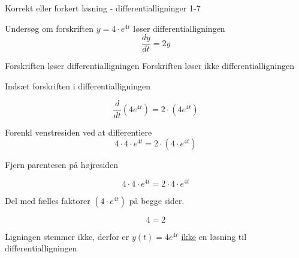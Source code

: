 \documentclass{article}
\begin{document}
\begin{exercise}{Korrekt eller forkert løsning - differentialligninger 1-7}
	
	
	Undersøg om forskriften $y = 4 \cdot e^{4t}$ løser differentialligningen
	\[
	\frac{dy}{dt} = 2y
	\]
	
\begin{multichoice}
	\itemfalse Forskriften løser differentialligningen 
	\itemtrue Forskriften løser ikke differentialligningen 
\end{multichoice}
	
	\hint
	
	Indsæt forskriften i differentialligningen
	
	\hint
	\[
	\frac{d}{dt} \left( 4 e^{4t}\right) = 2 \cdot \left( 4 e^{4t} \right)
	\]
	
	
	\hint
	
	Forenkl venstresiden ved at differentiere
	\[
	4 \cdot 4 \cdot e^{4t} = 2 \cdot \left(4 \cdot e^{4t} \right)
	\]
	
	\hint
	
	Fjern parentesen på højresiden
	
	\hint
	\[
	4 \cdot 4 \cdot e^{4t} = 2 \cdot 4 \cdot e^{4t}
	\]
	
	\hint
	Del med fælles faktorer $\left( 4 \cdot e^{4t} \right)$ på begge sider.
	
	\hint
	
	\[
	4 = 2
	\]
	
	
	\hint
	
	Ligningen stemmer ikke, derfor er $y(t) = 4 e^{4t}$ \underline{ikke} en løsning til differentialligningen
	
\end{exercise}

\newpage
\end{document}
